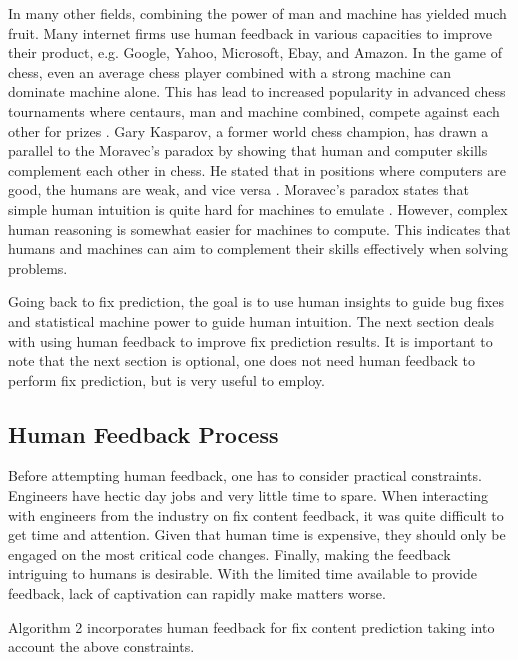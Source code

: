\documentclass[10pt, conference, letterpaper, compsocconf]{IEEEtran}
\begin{document}
In many other fields, combining the power of man and machine has yielded much fruit.
Many internet firms use human feedback in various capacities to improve their product, e.g. Google, Yahoo, Microsoft, Ebay, and Amazon.
In the game of chess, even an average chess player combined with a strong machine can dominate machine alone.
This has lead to increased popularity in advanced chess tournaments where centaurs, man and machine combined, compete against each other for prizes \cite{kasparov2010chess}.
Gary Kasparov, a former world chess champion, has drawn a parallel to the Moravec's paradox by showing that human and computer skills complement each other in chess.
He stated that in positions where computers are good, the humans are weak, and vice versa \cite{kasparov2010chess}.
Moravec's paradox states that simple human intuition is quite hard for machines to emulate \cite{moravec1998will}. However, complex human reasoning is somewhat easier
 for machines to compute. This indicates that humans and machines can aim to complement their skills effectively when solving problems.

Going back to fix prediction, the goal is to use human insights to guide bug fixes and statistical machine power to guide human intuition.
The next section deals with using human feedback to improve fix prediction results.
It is important to note that the next section is optional, one does not need human feedback to perform fix prediction, but is very useful to employ.

\subsection{Human Feedback Process}
\label{HumanFeedbackProcess}

Before attempting human feedback, one has to consider practical constraints. Engineers have hectic day jobs and very little time to spare.
When interacting with engineers from the industry on fix content feedback, it was quite difficult to get time and attention.
Given that human time is expensive, they should only be engaged on the most critical code changes.
Finally, making the feedback intriguing to humans is desirable.
With the limited time available to provide feedback, lack of captivation can rapidly make matters worse.

Algorithm 2 incorporates human feedback for fix content prediction taking into account the above constraints.
\end{document}
